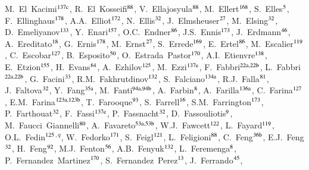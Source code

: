 \begin{flushleft}
M.~El~Kacimi$^\textrm{\scriptsize 137c}$,
R.~El~Kosseifi$^\textrm{\scriptsize 88}$,
V.~Ellajosyula$^\textrm{\scriptsize 88}$,
M.~Ellert$^\textrm{\scriptsize 168}$,
S.~Elles$^\textrm{\scriptsize 5}$,
F.~Ellinghaus$^\textrm{\scriptsize 178}$,
A.A.~Elliot$^\textrm{\scriptsize 172}$,
N.~Ellis$^\textrm{\scriptsize 32}$,
J.~Elmsheuser$^\textrm{\scriptsize 27}$,
M.~Elsing$^\textrm{\scriptsize 32}$,
D.~Emeliyanov$^\textrm{\scriptsize 133}$,
Y.~Enari$^\textrm{\scriptsize 157}$,
O.C.~Endner$^\textrm{\scriptsize 86}$,
J.S.~Ennis$^\textrm{\scriptsize 173}$,
J.~Erdmann$^\textrm{\scriptsize 46}$,
A.~Ereditato$^\textrm{\scriptsize 18}$,
G.~Ernis$^\textrm{\scriptsize 178}$,
M.~Ernst$^\textrm{\scriptsize 27}$,
S.~Errede$^\textrm{\scriptsize 169}$,
E.~Ertel$^\textrm{\scriptsize 86}$,
M.~Escalier$^\textrm{\scriptsize 119}$,
C.~Escobar$^\textrm{\scriptsize 127}$,
B.~Esposito$^\textrm{\scriptsize 50}$,
O.~Estrada~Pastor$^\textrm{\scriptsize 170}$,
A.I.~Etienvre$^\textrm{\scriptsize 138}$,
E.~Etzion$^\textrm{\scriptsize 155}$,
H.~Evans$^\textrm{\scriptsize 64}$,
A.~Ezhilov$^\textrm{\scriptsize 125}$,
M.~Ezzi$^\textrm{\scriptsize 137e}$,
F.~Fabbri$^\textrm{\scriptsize 22a,22b}$,
L.~Fabbri$^\textrm{\scriptsize 22a,22b}$,
G.~Facini$^\textrm{\scriptsize 33}$,
R.M.~Fakhrutdinov$^\textrm{\scriptsize 132}$,
S.~Falciano$^\textrm{\scriptsize 134a}$,
R.J.~Falla$^\textrm{\scriptsize 81}$,
J.~Faltova$^\textrm{\scriptsize 32}$,
Y.~Fang$^\textrm{\scriptsize 35a}$,
M.~Fanti$^\textrm{\scriptsize 94a,94b}$,
A.~Farbin$^\textrm{\scriptsize 8}$,
A.~Farilla$^\textrm{\scriptsize 136a}$,
C.~Farina$^\textrm{\scriptsize 127}$,
E.M.~Farina$^\textrm{\scriptsize 123a,123b}$,
T.~Farooque$^\textrm{\scriptsize 93}$,
S.~Farrell$^\textrm{\scriptsize 16}$,
S.M.~Farrington$^\textrm{\scriptsize 173}$,
P.~Farthouat$^\textrm{\scriptsize 32}$,
F.~Fassi$^\textrm{\scriptsize 137e}$,
P.~Fassnacht$^\textrm{\scriptsize 32}$,
D.~Fassouliotis$^\textrm{\scriptsize 9}$,
M.~Faucci~Giannelli$^\textrm{\scriptsize 80}$,
A.~Favareto$^\textrm{\scriptsize 53a,53b}$,
W.J.~Fawcett$^\textrm{\scriptsize 122}$,
L.~Fayard$^\textrm{\scriptsize 119}$,
O.L.~Fedin$^\textrm{\scriptsize 125}$$^{,q}$,
W.~Fedorko$^\textrm{\scriptsize 171}$,
S.~Feigl$^\textrm{\scriptsize 121}$,
L.~Feligioni$^\textrm{\scriptsize 88}$,
C.~Feng$^\textrm{\scriptsize 36b}$,
E.J.~Feng$^\textrm{\scriptsize 32}$,
H.~Feng$^\textrm{\scriptsize 92}$,
M.J.~Fenton$^\textrm{\scriptsize 56}$,
A.B.~Fenyuk$^\textrm{\scriptsize 132}$,
L.~Feremenga$^\textrm{\scriptsize 8}$,
P.~Fernandez~Martinez$^\textrm{\scriptsize 170}$,
S.~Fernandez~Perez$^\textrm{\scriptsize 13}$,
J.~Ferrando$^\textrm{\scriptsize 45}$,
$$
\end{flushleft}
